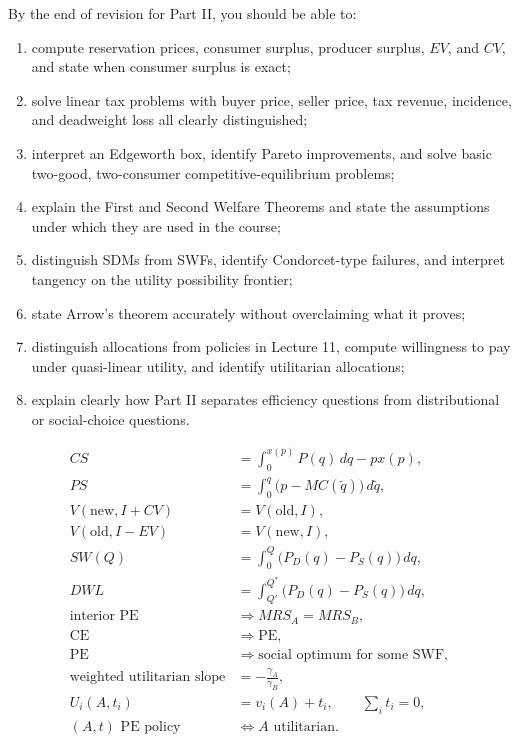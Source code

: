 \begin{examtip}[title={What you should be able to do before the exam}]
By the end of revision for Part II, you should be able to:
\begin{enumerate}
    \item compute reservation prices, consumer surplus, producer surplus, \(EV\), and \(CV\), and state when consumer surplus is exact;
    \item solve linear tax problems with buyer price, seller price, tax revenue, incidence, and deadweight loss all clearly distinguished;
    \item interpret an Edgeworth box, identify Pareto improvements, and solve basic two-good, two-consumer competitive-equilibrium problems;
    \item explain the First and Second Welfare Theorems and state the assumptions under which they are used in the course;
    \item distinguish SDMs from SWFs, identify Condorcet-type failures, and interpret tangency on the utility possibility frontier;
    \item state Arrow's theorem accurately without overclaiming what it proves;
    \item distinguish allocations from policies in Lecture 11, compute willingness to pay under quasi-linear utility, and identify utilitarian allocations;
    \item explain clearly how Part II separates efficiency questions from distributional or social-choice questions.
\end{enumerate}
\end{examtip}

\begin{keyformula}[title={Key Formula: Part II Final Recall Sheet}]
\begin{align*}
CS &= \int_0^{x(p)} P(q)\,dq-px(p), \\
PS &= \int_0^q \bigl(p-MC(\tilde q)\bigr)\,d\tilde q, \\
V(\text{new},I+CV) &= V(\text{old},I), \\
V(\text{old},I-EV) &= V(\text{new},I), \\
SW(Q) &= \int_0^Q \bigl(P_D(q)-P_S(q)\bigr)\,dq, \\
DWL &= \int_{Q'}^{Q^*} \bigl(P_D(q)-P_S(q)\bigr)\,dq, \\
\text{interior PE} &\Rightarrow MRS_A=MRS_B, \\
\text{CE} &\Rightarrow \text{PE}, \\
\text{PE} &\Rightarrow \text{social optimum for some SWF}, \\
\text{weighted utilitarian slope} &= -\frac{\gamma_A}{\gamma_B}, \\
U_i(A,t_i)&=v_i(A)+t_i,\qquad \sum_i t_i=0, \\
(A,t)\text{ PE policy} &\iff A\text{ utilitarian.}
\end{align*}
\end{keyformula}